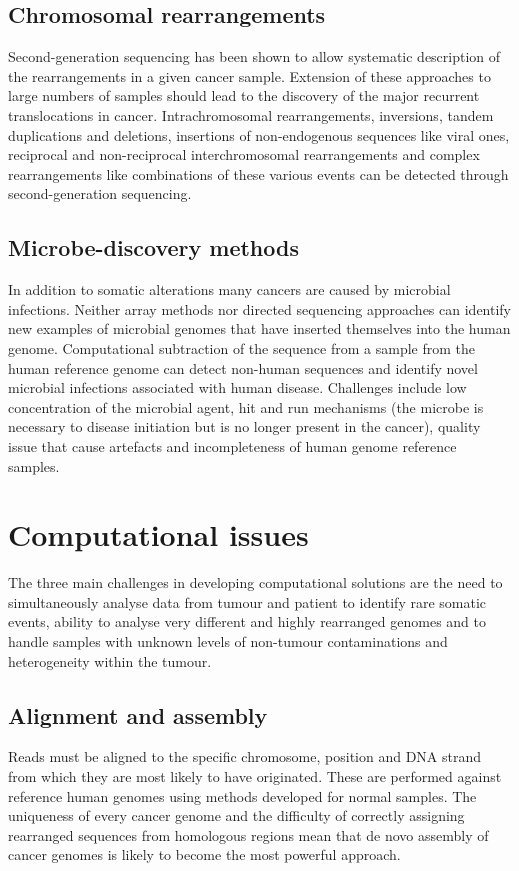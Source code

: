 	\subsection{Chromosomal rearrangements}
	Second-generation sequencing has been shown to allow systematic description of the rearrangements in a given cancer sample.
	Extension of these approaches to large numbers of samples should lead to the discovery of the major recurrent translocations in cancer.
	Intrachromosomal rearrangements, inversions, tandem duplications and deletions, insertions of non-endogenous sequences like viral ones, reciprocal and non-reciprocal interchromosomal rearrangements and complex rearrangements like combinations of these various events can be detected through second-generation sequencing.

	\subsection{Microbe-discovery methods}
	In addition to somatic alterations many cancers are caused by microbial infections.
	Neither array methods nor directed sequencing approaches can identify new examples of microbial genomes that have inserted themselves into the human genome.
	Computational subtraction of the sequence from a sample from the human reference genome can detect non-human sequences and identify novel microbial infections associated with human disease.
	Challenges include low concentration of the microbial agent, hit and run mechanisms (the microbe is necessary to disease initiation but is no longer present in the cancer), quality issue that cause artefacts and incompleteness of human genome reference samples.

\section{Computational issues}
The three main challenges in developing computational solutions are the need to simultaneously analyse data from tumour and patient to identify rare somatic events, ability to analyse very different and highly rearranged genomes and to handle samples with unknown levels of non-tumour contaminations and heterogeneity within the tumour.

	\subsection{Alignment and assembly}
	Reads must be aligned to the specific chromosome, position and DNA strand from which they are most likely to have originated.
	These are performed against reference human genomes using methods developed for normal samples.
	The uniqueness of every cancer genome and the difficulty of correctly assigning rearranged sequences from homologous regions mean that de novo assembly of cancer genomes is likely to become the most powerful approach.


